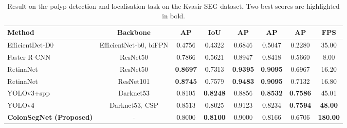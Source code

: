 \documentclass[journal]{IEEEtran}
\begin{document}
\begin{table*}[t!]
\caption{Result on the polyp detection and localisation task on the Kvasir-SEG dataset. Two best scores are highlighted in bold.}
\label{tab:quantitative result}
\centering
\def\arraystretch{1.2}
\begin{tabular}{l|c|c|c|c|c|c|c}
\toprule
\textbf{Method} & \textbf{Backbone} & {\textbf{AP}}   & \textbf{IoU}  & \textbf{AP} & \textbf{AP} &\textbf{AP} &\textbf{FPS}\\ \midrule
EfficientDet-D0~\cite{tan2020efficientdet}
& EfficientNet-b0, biFPN & 0.4756 & 0.4322 &0.6846 &0.5047 & 0.2280 & 35.00\\ \hline

Faster R-CNN~\cite{ren2015faster} & ResNet50 & 0.7866 & 0.5621 & 0.8947 & 0.8418 & 0.5660 & 8.00\\ \hline

RetinaNet~\cite{lin2017focal} & ResNet50 &\textbf{0.8697} & 0.7313 & \textbf{0.9395} & \textbf{0.9095} & 0.6967 & 16.20\\ \hline
RetinaNet~\cite{lin2017focal} & ResNet101 & \textbf{0.8745} & 0.7579 & \textbf{0.9483} & \textbf{0.9095} &0.7132 & 16.80\\  \hline
YOLOv3+spp~\cite{redmon2018yolov3} & Darknet53 & 0.8105 & \textbf{0.8248} &0.8856 &\textbf{0.8532} & {\textbf{0.7586}} & 45.01\\
\hline
YOLOv4~\cite{bochkovskiy2020yolov4} & Darknet53, CSP & 0.8513 & 0.8025 &0.9123 & 0.8234 & \textbf{0.7594} & \textbf{48.00}\\
\hline
\textbf{ColonSegNet (Proposed)} & - & 0.8000 & \textbf{0.8100} & 0.9000 & 0.8166 & 0.6706 & \textbf{180.00}\\
\bottomrule
\end{tabular}
\end{table*}
\end{document}
